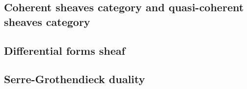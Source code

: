 \subsection{Coherent sheaves category and quasi-coherent sheaves category}
	
\subsection{Differential forms sheaf}
	
\subsection{Serre-Grothendieck duality}
	
